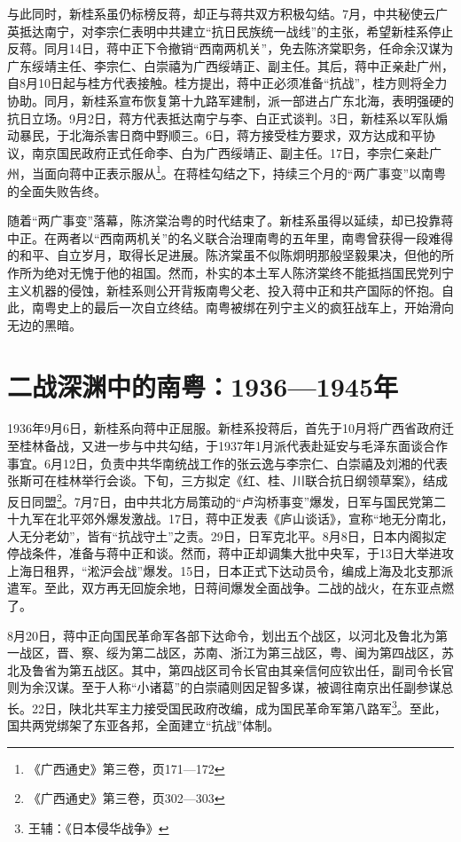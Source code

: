 与此同时，新桂系虽仍标榜反蒋，却正与蒋共双方积极勾结。7月，中共秘使云广英抵达南宁，对李宗仁表明中共建立“抗日民族统一战线”的主张，希望新桂系停止反蒋。同月14日，蒋中正下令撤销“西南两机关”，免去陈济棠职务，任命余汉谋为广东绥靖主任、李宗仁、白崇禧为广西绥靖正、副主任。其后，蒋中正亲赴广州，自8月10日起与桂方代表接触。桂方提出，蒋中正必须准备“抗战”，桂方则将全力协助。同月，新桂系宣布恢复第十九路军建制，派一部进占广东北海，表明强硬的抗日立场。9月2日，蒋方代表抵达南宁与李、白正式谈判。3日，新桂系以军队煽动暴民，于北海杀害日商中野顺三。6日，蒋方接受桂方要求，双方达成和平协议，南京国民政府正式任命李、白为广西绥靖正、副主任。17日，李宗仁亲赴广州，当面向蒋中正表示服从\footnote{《广西通史》第三卷，页171—172}。在蒋桂勾结之下，持续三个月的“两广事变”以南粤的全面失败告终。

随着“两广事变”落幕，陈济棠治粤的时代结束了。新桂系虽得以延续，却已投靠蒋中正。在两者以“西南两机关”的名义联合治理南粤的五年里，南粤曾获得一段难得的和平、自立岁月，取得长足进展。陈济棠虽不似陈炯明那般坚毅果决，但他的所作所为绝对无愧于他的祖国。然而，朴实的本土军人陈济棠终不能抵挡国民党列宁主义机器的侵蚀，新桂系则公开背叛南粤父老、投入蒋中正和共产国际的怀抱。自此，南粤史上的最后一次自立终结。南粤被绑在列宁主义的疯狂战车上，开始滑向无边的黑暗。

\section{二战深渊中的南粤：1936—1945年}

1936年9月6日，新桂系向蒋中正屈服。新桂系投蒋后，首先于10月将广西省政府迁至桂林备战，又进一步与中共勾结，于1937年1月派代表赴延安与毛泽东面谈合作事宜。6月12日，负责中共华南统战工作的张云逸与李宗仁、白崇禧及刘湘的代表张斯可在桂林举行会谈。下旬，三方拟定《红、桂、川联合抗日纲领草案》，结成反日同盟\footnote{《广西通史》第三卷，页302—303}。7月7日，由中共北方局策动的“卢沟桥事变”爆发，日军与国民党第二十九军在北平郊外爆发激战。17日，蒋中正发表《庐山谈话》，宣称“地无分南北，人无分老幼”，皆有“抗战守土”之责。29日，日军克北平。8月8日，日本内阁拟定停战条件，准备与蒋中正和谈。然而，蒋中正却调集大批中央军，于13日大举进攻上海日租界，“淞沪会战”爆发。15日，日本正式下达动员令，编成上海及北支那派遣军。至此，双方再无回旋余地，日蒋间爆发全面战争。二战的战火，在东亚点燃了。

8月20日，蒋中正向国民革命军各部下达命令，划出五个战区，以河北及鲁北为第一战区，晋、察、绥为第二战区，苏南、浙江为第三战区，粤、闽为第四战区，苏北及鲁省为第五战区。其中，第四战区司令长官由其亲信何应钦出任，副司令长官则为余汉谋。至于人称“小诸葛”的白崇禧则因足智多谋，被调往南京出任副参谋总长。22日，陕北共军主力接受国民政府改编，成为国民革命军第八路军\footnote{王辅：《日本侵华战争》}。至此，国共两党绑架了东亚各邦，全面建立“抗战”体制。


